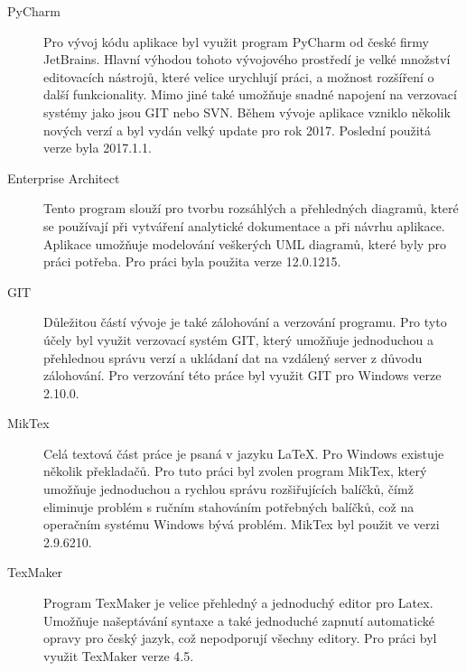 \documentclass[thesis=B,czech]{resources/FITthesis}[2012/06/26]
\begin{document}
\begin{description}
\item[PyCharm] Pro vývoj kódu aplikace byl využit program PyCharm od české firmy JetBrains. Hlavní výhodou tohoto vývojového prostředí je velké množství editovacích nástrojů, které velice urychlují práci, a možnost rozšíření o další funkcionality. Mimo jiné také umožňuje snadné napojení na verzovací systémy jako jsou GIT nebo SVN. Během vývoje aplikace vzniklo několik nových verzí a byl vydán velký update pro rok 2017. Poslední použitá verze byla 2017.1.1.

\item[Enterprise Architect] Tento program slouží pro tvorbu rozsáhlých a přehledných diagramů, které se používají při vytváření analytické dokumentace a při návrhu aplikace. Aplikace umožňuje modelování veškerých UML diagramů, které byly pro práci potřeba. Pro práci byla použita verze 12.0.1215.

\item[GIT] Důležitou částí vývoje je také zálohování a verzování programu. Pro tyto účely byl využit verzovací systém GIT, který umožňuje jednoduchou a přehlednou správu verzí a ukládaní dat na vzdálený server z důvodu zálohování. Pro verzování této práce byl využit GIT pro Windows verze 2.10.0.

\item[MikTex] Celá textová část práce je psaná v jazyku \LaTeX. Pro Windows existuje několik překladačů. Pro tuto práci byl zvolen program MikTex, který umožňuje jednoduchou a rychlou správu rozšiřujících balíčků, čímž eliminuje problém s ručním stahováním potřebných balíčků, což na operačním systému Windows bývá problém. MikTex byl použit ve verzi 2.9.6210.

\item[TexMaker] Program TexMaker je velice přehledný a jednoduchý editor pro Latex. Umožňuje našeptávání syntaxe a také jednoduché zapnutí automatické opravy pro český jazyk, což nepodporují všechny editory. Pro práci byl využit TexMaker verze 4.5.
\end{description}
\end{document}
